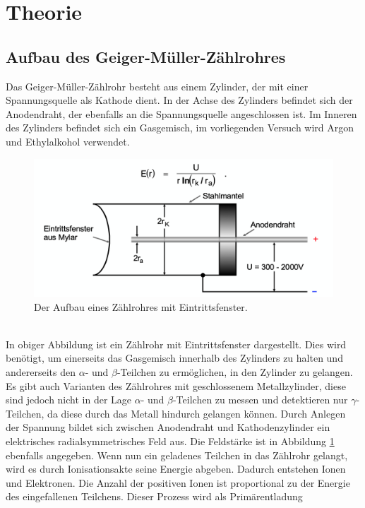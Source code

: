 \section{Theorie}
  \subsection{Aufbau des Geiger-Müller-Zählrohres}
    Das Geiger-Müller-Zählrohr besteht aus einem Zylinder, der mit einer Spannungsquelle als
    Kathode dient. In der Achse des Zylinders befindet sich der Anodendraht, der ebenfalls an die
    Spannungsquelle angeschlossen ist. Im Inneren des Zylinders befindet sich ein Gasgemisch,
    im vorliegenden Versuch wird Argon und Ethylalkohol verwendet.
    \begin{figure}
      \centering
        \label{fig:aufbau1}
        \includegraphics[scale=0.3]{content/AufbauGMZ.png}
        \caption{Der Aufbau eines Zählrohres mit Eintrittsfenster.}
    \end{figure}
    \\
    In obiger Abbildung ist ein Zählrohr mit Eintrittsfenster dargestellt. Dies wird benötigt,
    um einerseits das Gasgemisch innerhalb des Zylinders zu halten und andererseits den
    $\alpha$- und $\beta$-Teilchen zu ermöglichen, in den Zylinder zu gelangen. Es gibt auch
    Varianten des Zählrohres mit geschlossenem Metallzylinder, diese sind jedoch nicht in der Lage
    $\alpha$- und $\beta$-Teilchen zu messen und detektieren nur $\gamma$-Teilchen, da diese durch das
    Metall hindurch gelangen können.
    Durch Anlegen der Spannung bildet sich zwischen Anodendraht und Kathodenzylinder ein elektrisches
    radialsymmetrisches Feld aus. Die Feldstärke ist in Abbildung \ref{fig:aufbau1} ebenfalls
    angegeben. Wenn nun ein geladenes Teilchen in das Zählrohr gelangt, wird es durch Ionisationsakte
    seine Energie abgeben. Dadurch entstehen Ionen und Elektronen. Die Anzahl der positiven Ionen ist
    proportional zu der Energie des eingefallenen Teilchens. Dieser Prozess wird als Primärentladung
